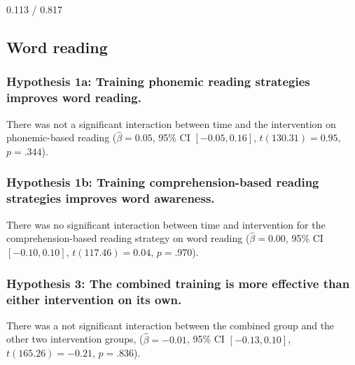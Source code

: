 \documentclass[
  english,
  ,man]{apa6}
\begin{document}
0.113 / 0.817

\hypertarget{word-reading}{%
\subsection{Word reading}\label{word-reading}}

\hypertarget{hypothesis-1a-training-phonemic-reading-strategies-improves-word-reading.}{%
\subsubsection{Hypothesis 1a: Training phonemic reading strategies improves word reading.}\label{hypothesis-1a-training-phonemic-reading-strategies-improves-word-reading.}}

There was not a significant interaction between time and the intervention on phonemic-based reading (\(\hat{\beta} = 0.05\), 95\% CI \([-0.05, 0.16]\), \(t(130.31) = 0.95\), \(p = .344\)).

\hypertarget{hypothesis-1b-training-comprehension-based-reading-strategies-improves-word-awareness.}{%
\subsubsection{Hypothesis 1b: Training comprehension-based reading strategies improves word awareness.}\label{hypothesis-1b-training-comprehension-based-reading-strategies-improves-word-awareness.}}

There was no significant interaction between time and intervention for the comprehension-based reading strategy on word reading (\(\hat{\beta} = 0.00\), 95\% CI \([-0.10, 0.10]\), \(t(117.46) = 0.04\), \(p = .970\)).

\hypertarget{hypothesis-3-the-combined-training-is-more-effective-than-either-intervention-on-its-own.-1}{%
\subsubsection{Hypothesis 3: The combined training is more effective than either intervention on its own.}\label{hypothesis-3-the-combined-training-is-more-effective-than-either-intervention-on-its-own.-1}}

There was a not significant interaction between the combined group and the other two intervention groups, (\(\hat{\beta} = -0.01\), 95\% CI \([-0.13, 0.10]\), \(t(165.26) = -0.21\), \(p = .836\)).
\end{document}
